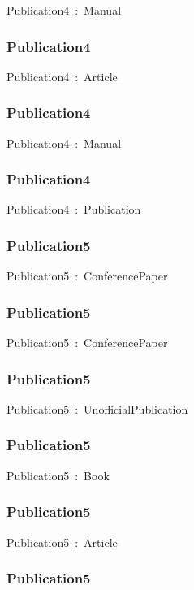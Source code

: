 \documentclass{article}
\begin{document}
Publication4~:~Manual

\subsubsection*{Publication4}

Publication4~:~Article

\subsubsection*{Publication4}

Publication4~:~Manual

\subsubsection*{Publication4}

Publication4~:~Publication

\subsubsection*{Publication5}

Publication5~:~ConferencePaper

\subsubsection*{Publication5}

Publication5~:~ConferencePaper

\subsubsection*{Publication5}

Publication5~:~UnofficialPublication

\subsubsection*{Publication5}

Publication5~:~Book

\subsubsection*{Publication5}

Publication5~:~Article

\subsubsection*{Publication5}
\end{document}
